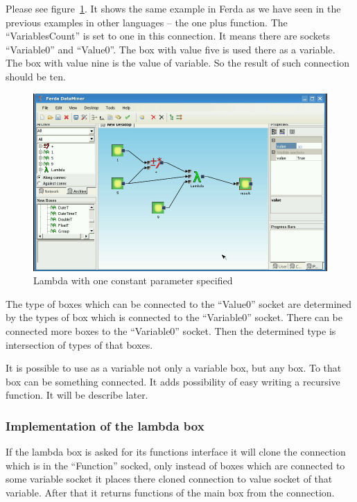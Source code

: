 \documentclass[a4paper,12pt]{book}
\begin{document}
Please see figure~\ref{fig:boxLambdaOnePlus}. It shows the same example in Ferda as we have seen in the previous examples in other languages -- the one plus function. The ``VariablesCount'' is set to one in this connection. It means there are sockets ``Variable0'' and ``Value0''. The box with value five is used there as a variable. The box with value nine is the value of variable. So the result of such connection should be ten.
\begin{figure}
	\includegraphics[width=1\textwidth]{lambdaBasic3.png}
	\caption{Lambda with one constant parameter specified}
	\label{fig:boxLambdaOnePlus}
\end{figure}

The type of boxes which can be connected to the ``Value0'' socket are determined by the types of box which is connected to the ``Variable0'' socket. There can be connected more boxes to the ``Variable0'' socket. Then the determined type is intersection of types of that boxes.

It is possible to use as a variable not only a variable box, but any box. To that box can be something connected. It adds possibility of easy writing a recursive function. It will be describe later.   

\subsubsection{Implementation of the lambda box}
If the lambda box is asked for its functions interface it will clone the connection which is in the ``Function'' socked, only instead of boxes which are connected to some variable socket it places there cloned connection to value socket of that variable. After that it returns functions of the main box from the connection.
\end{document}
